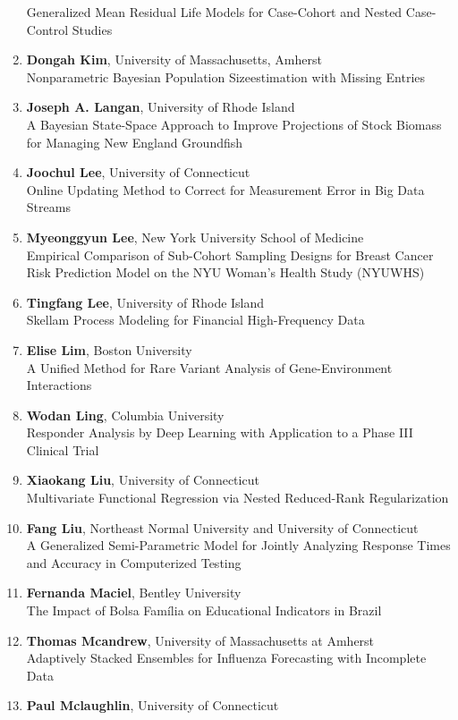 \begin{enumerate}
Generalized Mean Residual Life Models for Case-Cohort and Nested Case-Control Studies
\item \textbf{Dongah Kim}, University of Massachusetts, Amherst \\
Nonparametric Bayesian Population Sizeestimation with Missing Entries
\item \textbf{Joseph A. Langan}, University of Rhode Island \\
A Bayesian State-Space Approach to Improve Projections of Stock Biomass for Managing New England Groundfish
\item \textbf{Joochul Lee}, University of Connecticut \\
Online Updating Method to Correct for Measurement Error in Big Data Streams
\item \textbf{Myeonggyun Lee}, New York University School of Medicine \\
Empirical Comparison of Sub-Cohort Sampling Designs for Breast Cancer Risk Prediction Model on the NYU Woman’s Health Study (NYUWHS)
\item \textbf{Tingfang Lee}, University of Rhode Island \\
Skellam Process Modeling for Financial High-Frequency Data
\item \textbf{Elise Lim}, Boston University \\
A Unified Method for Rare Variant Analysis of Gene-Environment Interactions
\item \textbf{Wodan Ling}, Columbia University \\
Responder Analysis by Deep Learning with Application to a Phase III Clinical Trial
\item \textbf{Xiaokang Liu}, University of Connecticut \\
Multivariate Functional Regression via Nested Reduced-Rank Regularization
\item \textbf{Fang Liu}, Northeast Normal University and University of Connecticut \\
A Generalized Semi-Parametric Model for Jointly Analyzing Response Times and Accuracy in Computerized Testing
\item \textbf{Fernanda Maciel}, Bentley University \\
The Impact of Bolsa Família on Educational Indicators in Brazil
\item \textbf{Thomas Mcandrew}, University of Massachusetts at Amherst \\
Adaptively Stacked Ensembles for Influenza Forecasting with Incomplete Data
\item \textbf{Paul Mclaughlin}, University of Connecticut \\

\end{enumerate}
